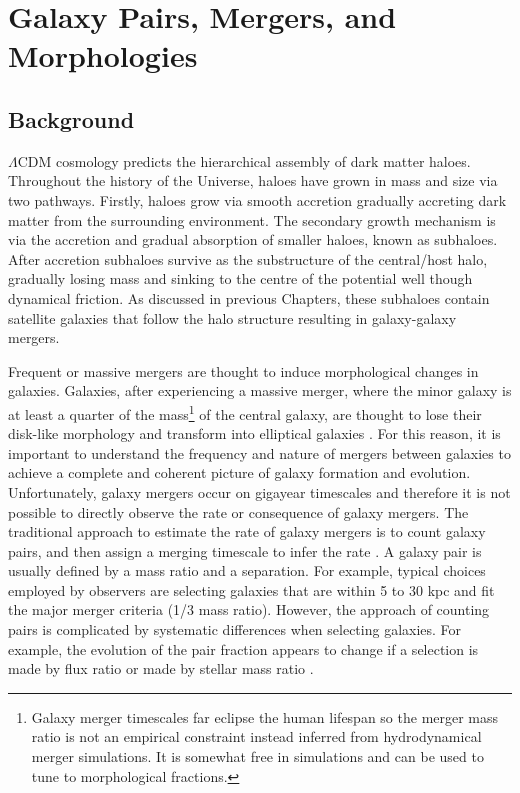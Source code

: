 
\chapter{Galaxy Pairs, Mergers, and Morphologies} 
\label{Chapter:GalPairs}

\section{Background}

$\Lambda$CDM cosmology predicts the hierarchical assembly of dark matter haloes.
Throughout the history of the Universe, haloes have grown in mass and size via two pathways. 
Firstly, haloes grow via smooth accretion gradually accreting dark matter from the surrounding environment. 
The secondary growth mechanism is via the accretion and gradual absorption of smaller haloes, known as subhaloes. 
After accretion subhaloes survive as the substructure of the central/host halo, gradually losing mass and sinking to the centre of the potential well though dynamical friction. As discussed in previous Chapters, these subhaloes contain satellite galaxies that follow the halo structure resulting in galaxy-galaxy mergers.

Frequent or massive mergers are thought to induce morphological changes in galaxies. 
Galaxies, after experiencing a massive merger, where the minor galaxy is at least a quarter of the mass\footnote{Galaxy merger timescales far eclipse the human lifespan so the merger mass ratio is not an empirical constraint instead inferred from hydrodynamical merger simulations. It is somewhat free in simulations and can be used to tune to morphological fractions.} of the central galaxy, are thought to lose their disk-like morphology and transform into elliptical galaxies \citep{Negroponte1983SimulationsGalaxies, DeLucia2006TheGalaxies}. 
For this reason, it is important to understand the frequency and nature of mergers between galaxies to achieve a complete and coherent picture of galaxy formation and evolution. 
Unfortunately, galaxy mergers occur on gigayear timescales and therefore it is not possible to directly observe the rate or consequence of galaxy mergers. 
The traditional approach to estimate the rate of galaxy mergers is to count galaxy pairs, and then assign a merging timescale to infer the rate \citep{Conselice20033,Conselice2008TheField,Mundy2017A3.5,Duncan2019ObservationalFields}.
A galaxy pair is usually defined by a mass ratio and a separation. For example, typical choices employed by observers are selecting galaxies that are within 5 to 30 kpc and fit the major merger criteria (1/3 mass ratio).
However, the approach of counting pairs is complicated by systematic differences when selecting galaxies. For example, the evolution of the pair fraction appears to change if a selection is made by flux ratio or made by stellar mass ratio \citep{Man2016RESOLVING03}.

